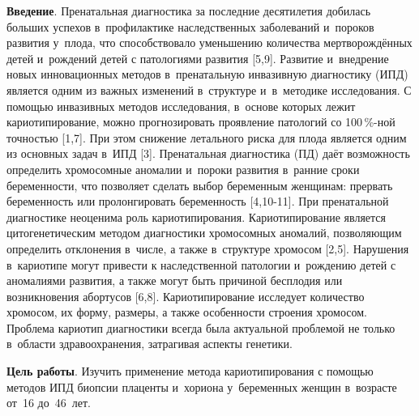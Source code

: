 \vspace{-16pt}



\makeProcTitleIIRazdel
{}

\textbf{Введение}. Пренатальная диагностика за последние десятилетия добилась больших успехов в~профилактике наследственных заболеваний и~пороков развития у~плода, что способствовало уменьшению количества мертворождённых детей и~рождений детей с патологиями развития [5,9]. Развитие и~внедрение новых инновационных методов в~пренатальную инвазивную диагностику (ИПД) является одним из важных изменений в~структуре и~в~методике исследования. С помощью инвазивных методов исследования, в~основе которых лежит кариотипирование, можно прогнозировать проявление патологий со 100\,\%-ной точностью [1,7]. При этом снижение летального риска для плода является одним из основных задач в~ИПД [3]. Пренатальная диагностика (ПД) даёт возможность определить хромосомные аномалии и~пороки развития в~ранние сроки беременности, что позволяет сделать выбор беременным женщинам: прервать беременность или пролонгировать беременность [4,10-11]. При пренатальной диагностике неоценима роль кариотипирования. Кариотипирование является цитогенетическим методом диагностики хромосомных аномалий, позволяющим определить отклонения в~числе, а также в~структуре хромосом [2,5]. Нарушения в~кариотипе могут привести к наследственной патологии и~рождению детей с аномалиями развития, а также могут быть причиной бесплодия или возникновения абортусов [6,8]. Кариотипирование исследует количество хромосом, их форму, размеры, а также особенности строения хромосом. Проблема кариотип диагностики всегда была актуальной проблемой не только в~области здравоохранения, затрагивая аспекты генетики.

\textbf{Цель работы}. Изучить применение метода кариотипирования с помощью методов ИПД биопсии плаценты и~хориона у~беременных женщин в~возрасте от~16 до~46~лет.

